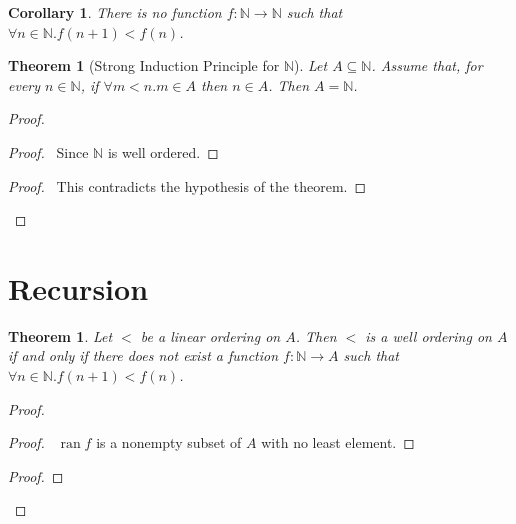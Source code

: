 \documentclass{book}
\let\qed\relax
\newtheorem{cor}{Corollary}[ax]
\newtheorem{thm}[ax]{Theorem}
\theoremstyle{definition}
\newcommand{\ran}{\ensuremath{\operatorname{ran}}}
\begin{document}
\begin{cor}
There is no function $f : \mathbb{N} \rightarrow \mathbb{N}$ such that $\forall n \in \mathbb{N}. f(n+1) < f(n)$.
\end{cor}

\begin{thm}[Strong Induction Principle for $\mathbb{N}$]
Let $A \subseteq \mathbb{N}$. Assume that, for every $n \in \mathbb{N}$, if $\forall m < n. m \in A$ then $n \in A$. Then $A = \mathbb{N}$.
\end{thm}

\begin{proof}
\pf
{}
\begin{proof}
	\pf\ Since $\mathbb{N}$ is well ordered.
\end{proof}
\qedstep
\begin{proof}
	\pf\ This contradicts the hypothesis of the theorem.
\end{proof}
\qed
\end{proof}


\section{Recursion}

\begin{thm}
Let $<$ be a linear ordering on $A$. Then $<$ is a well ordering on $A$ if and only if there does not exist a function $f : \mathbb{N} \rightarrow A$ such that $\forall n \in \mathbb{N}. f(n+1) < f(n)$.
\end{thm}

\begin{proof}
\pf
{}
\begin{proof}
	\pf\ $\ran f$ is a nonempty subset of $A$ with no least element.
\end{proof}
\begin{proof}
\end{proof}
\qed
\end{proof}
\end{document}
